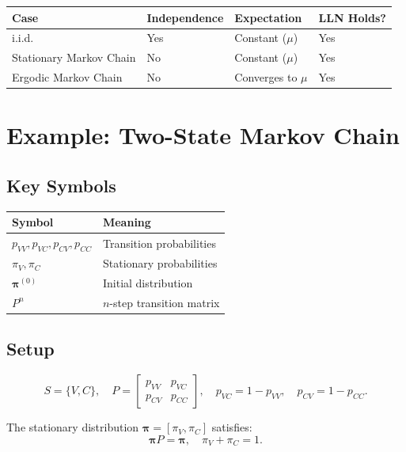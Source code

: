 \begin{center}
\begin{tabular}{llll}
\toprule
\textbf{Case} & \textbf{Independence} & \textbf{Expectation} & \textbf{LLN Holds?} \\
\midrule
i.i.d. & Yes & Constant ($\mu$) & Yes \\
Stationary Markov Chain & No & Constant ($\mu$) & Yes \\
Ergodic Markov Chain & No & Converges to $\mu$ & Yes \\
\bottomrule
\end{tabular}
\end{center}



\section{Example: Two-State Markov Chain}

\subsection*{Key Symbols}

\begin{center}
\begin{tabular}{ll}
\toprule
\textbf{Symbol} & \textbf{Meaning} \\
\midrule
$p_{VV}, p_{VC}, p_{CV}, p_{CC}$ & Transition probabilities \\
$\pi_V, \pi_C$ & Stationary probabilities \\
$\boldsymbol{\pi}^{(0)}$ & Initial distribution \\
$P^n$ & $n$-step transition matrix \\
\bottomrule
\end{tabular}
\end{center}


\subsection*{Setup}

\[
S = \{V, C\}, \quad
P =
\begin{bmatrix}
p_{VV} & p_{VC} \\
p_{CV} & p_{CC}
\end{bmatrix},
\quad
p_{VC} = 1 - p_{VV}, \quad
p_{CV} = 1 - p_{CC}.
\]

The stationary distribution $\boldsymbol{\pi} = [\pi_V, \pi_C]$ satisfies:
\[
\boldsymbol{\pi} P = \boldsymbol{\pi}, \quad \pi_V + \pi_C = 1.
\]

